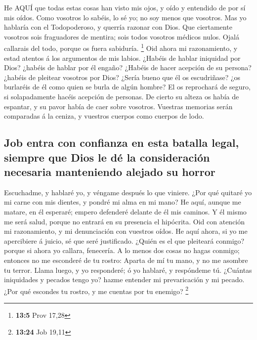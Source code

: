  He AQUÍ que todas estas cosas han visto mis ojos, y oído y
entendido de por sí mis oídos.  Como vosotros lo sabéis, lo
sé yo; no soy menos que vosotros.  Mas yo hablaría con el
Todopoderoso, y querría razonar con Dios.  Que ciertamente
vosotros sois fraguadores de mentira; sois todos vosotros médicos nulos.
 Ojalá callarais del todo, porque os fuera sabiduría.
\footnote{\textbf{13:5} Prov 17,28}  Oid ahora mi
razonamiento, y estad atentos á los argumentos de mis labios.
 ¿Habéis de hablar iniquidad por Dios? ¿habéis de hablar por
él engaño?  ¿Habéis de hacer acepción de su persona? ¿habéis
de pleitear vosotros por Dios?  ¿Sería bueno que él os
escudriñase? ¿os burlaréis de él como quien se burla de algún hombre?
 El os reprochará de seguro, si solapadamente hacéis
acepción de personas.  De cierto su alteza os había de
espantar, y su pavor había de caer sobre vosotros. 
Vuestras memorias serán comparadas á la ceniza, y vuestros cuerpos como
cuerpos de lodo.

\hypertarget{job-entra-con-confianza-en-esta-batalla-legal-siempre-que-dios-le-duxe9-la-consideraciuxf3n-necesaria-manteniendo-alejado-su-horror}{%
\subsection{Job entra con confianza en esta batalla legal, siempre que
Dios le dé la consideración necesaria manteniendo alejado su
horror}\label{job-entra-con-confianza-en-esta-batalla-legal-siempre-que-dios-le-duxe9-la-consideraciuxf3n-necesaria-manteniendo-alejado-su-horror}}

 Escuchadme, y hablaré yo, y véngame después lo que
viniere.  ¿Por qué quitaré yo mi carne con mis dientes, y
pondré mi alma en mi mano?  He aquí, aunque me matare, en
él esperaré; empero defenderé delante de él mis caminos.  Y
él mismo me será salud, porque no entrará en su presencia el hipócrita.
 Oid con atención mi razonamiento, y mi denunciación con
vuestros oídos.  He aquí ahora, si yo me apercibiere á
juicio, sé que seré justificado.  ¿Quién es el que
pleiteará conmigo? porque si ahora yo callara, fenecería. 
A lo menos dos cosas no hagas conmigo; entonces no me esconderé de tu
rostro:  Aparta de mí tu mano, y no me asombre tu terror.
 Llama luego, y yo responderé; ó yo hablaré, y respóndeme
tú.  ¿Cuántas iniquidades y pecados tengo yo? hazme
entender mi prevaricación y mi pecado.  ¿Por qué escondes
tu rostro, y me cuentas por tu enemigo? \footnote{\textbf{13:24} Job
  19,11}

